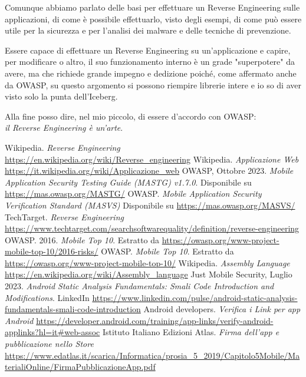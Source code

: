 \documentclass{article}
\begin{document}
Comunque abbiamo parlato delle basi per effettuare un Reverse Engineering sulle applicazioni, di come è possibile effettuarlo, visto degli esempi,  
di come può essere utile per la sicurezza e per l'analisi dei malware e delle tecniche di prevenzione.
\medskip

Essere capace di effettuare un Reverse Engineering su un'applicazione e capire, per modificare o altro,
il suo funzionamento interno è un grade "superpotere" da avere, ma che richiede grande impegno e dedizione poiché, come affermato anche da OWASP, 
su questo argomento si possono riempire librerie intere e io so di aver visto solo la punta dell'Iceberg.

Alla fine posso dire, nel mio piccolo, di essere d'accordo con OWASP:\\ \textit{il Reverse Engineering è un'arte}. 
\begin{thebibliography}{9}
     Wikipedia. \textit{Reverse Engineering} \url{https://en.wikipedia.org/wiki/Reverse_engineering}
     Wikipedia. \textit{Applicazione Web} \url{https://it.wikipedia.org/wiki/Applicazione_web}
     OWASP, Ottobre 2023. \textit{Mobile Application Security Testing Guide (MASTG) v1.7.0}.  Disponibile su \url{https://mas.owasp.org/MASTG/}
     OWASP. \textit{Mobile Application Security Verification Standard (MASVS)} Disponibile su \url{https://mas.owasp.org/MASVS/}
     TechTarget. \textit{Reverse Engineering} \url{https://www.techtarget.com/searchsoftwarequality/definition/reverse-engineering}
     OWASP. 2016. \textit{Mobile Top 10}. Estratto da \url{https://owasp.org/www-project-mobile-top-10/2016-risks/}
     OWASP. \textit{Mobile Top 10}. Estratto da \url{https://owasp.org/www-project-mobile-top-10/}
     Wikipedia. \textit{Assembly Language} \url{https://en.wikipedia.org/wiki/Assembly_language}
     Just Mobile Security, Luglio 2023. \textit{Android Static Analysis Fundamentals: Smali Code Introduction and Modifications}. LinkedIn \url{https://www.linkedin.com/pulse/android-static-analysis-fundamentals-smali-code-introduction}
     Android developers. \textit{Verifica i Link per app Android} \url{https://developer.android.com/training/app-links/verify-android-applinks?hl=it#web-assoc}
     Istituto Italiano Edizioni Atlas. \textit{Firma dell'app e pubblicazione nello Store} \url{https://www.edatlas.it/scarica/Informatica/prosia_5_2019/Capitolo5Mobile/MaterialiOnline/FirmaPubblicazioneApp.pdf}

\end{thebibliography}
\end{document}
